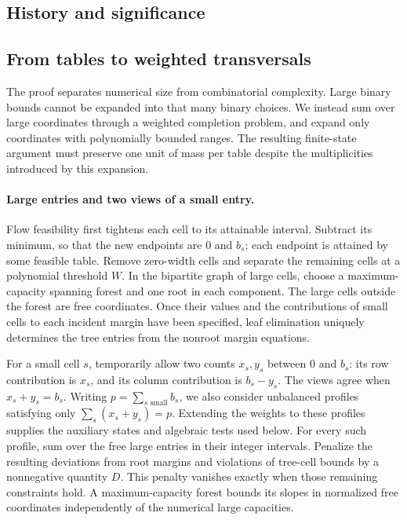 \subsection{History and significance}


\subsection{From tables to weighted transversals}
The proof separates numerical size from combinatorial complexity.
Large binary bounds cannot be expanded into that many binary choices.
We instead sum over large coordinates through a weighted completion
problem, and expand only coordinates with polynomially bounded ranges.
The resulting finite-state argument must preserve one unit of mass per
table despite the multiplicities introduced by this expansion.

\paragraph{Large entries and two views of a small entry.}
Flow feasibility first tightens each cell to its attainable interval.
Subtract its minimum, so that the new endpoints are $0$ and $b_s$;
each endpoint is attained by some feasible table. Remove zero-width
cells and separate the remaining cells at a polynomial threshold $W$.
In the bipartite graph of large cells, choose a maximum-capacity
spanning forest and one root in each component. The large cells outside
the forest are free coordinates. Once their values and the contributions
of small cells to each incident margin have been specified, leaf
elimination uniquely determines the tree entries from the nonroot
margin equations.

For a small cell $s$, temporarily allow two counts $x_s,y_s$ between
$0$ and $b_s$: its row contribution is $x_s$, and its column
contribution is $b_s-y_s$. The views agree when $x_s+y_s=b_s$.
Writing $p=\sum_{s\text{ small}}b_s$, we also consider unbalanced
profiles satisfying only $\sum_s(x_s+y_s)=p$. Extending the weights
to these profiles supplies the auxiliary states and algebraic tests
used below. For every such
profile, sum over the free large entries in their integer intervals.
Penalize the resulting deviations from root margins and violations of
tree-cell bounds by a nonnegative quantity $D$. This penalty vanishes
exactly when those remaining constraints hold. A maximum-capacity
forest bounds its slopes in normalized free coordinates independently
of the numerical large capacities.

